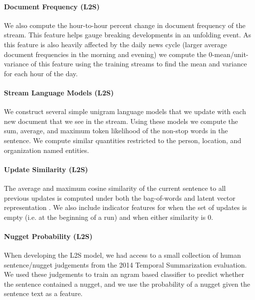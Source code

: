 \paragraph{Document Frequency (L2S)} We also compute the hour-to-hour
percent change in document frequency of the stream. This
feature helps gauge breaking developments in an unfolding
event. As this feature is also heavily affected by the daily
news cycle (larger average document frequencies in the morning
and evening) we compute the 0-mean/unit-variance of this
feature using the training streams to find the mean and variance
for each hour of the day.

\paragraph{Stream Language Models (L2S)}
We construct several simple unigram language models that we update with 
each new document that we see in the stream. Using these models 
we compute the sum, average, and maximum token likelihood
of the non-stop words
in the sentence. We compute similar quantities restricted to
the person, location, and organization named entities.

\paragraph{Update Similarity (L2S)} The average and maximum cosine similarity
of the current sentence to all previous updates is computed
under both the \tfidf{} bag-of-words and latent vector
representation \citep{guo2012simple}. 
We also include indicator features for when
the set of updates is empty (i.e. at the beginning of a run) and
when either similarity is 0.

\paragraph{Nugget Probability (L2S)}
\label{par:nuggetprob}
When developing the L2S model, we had access to a small collection of
human sentence/nugget judgements from the 2014 Temporal Summarization 
evaluation.
We used
these judgements to train an ngram based classifier to predict whether
the sentence contained a nugget, and we use the probability of a nugget
given the sentence text as a feature. 


